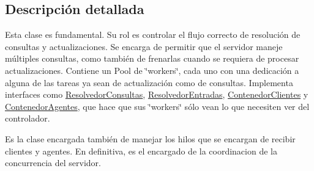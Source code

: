 \subsection{\-Descripción detallada}
\-Esta clase es fundamental. \-Su rol es controlar el flujo correcto de resolución de consultas y actualizaciones. \-Se encarga de permitir que el servidor maneje múltiples consultas, como también de frenarlas cuando se requiera de procesar actualizaciones. \-Contiene un \-Pool de \char`\"{}workers\char`\"{}, cada uno con una dedicación a alguna de las tareas ya sean de actualización como de consultas. \-Implementa interfaces como \hyperlink{classResolvedorConsultas}{\-Resolvedor\-Consultas}, \hyperlink{classResolvedorEntradas}{\-Resolvedor\-Entradas}, \hyperlink{classContenedorClientes}{\-Contenedor\-Clientes} y \hyperlink{classContenedorAgentes}{\-Contenedor\-Agentes}, que hace que sus \char`\"{}workers\char`\"{} sólo vean lo que necesiten ver del controlador.

\-Es la clase encargada también de manejar los hilos que se encargan de recibir clientes y agentes. \-En definitiva, es el encargado de la coordinacion de la concurrencia del servidor. 


